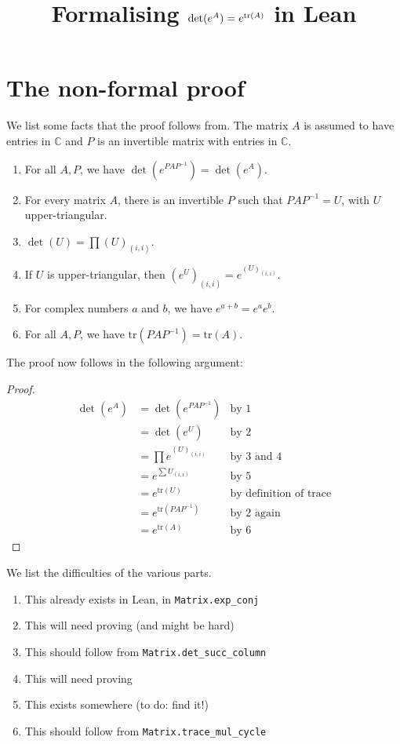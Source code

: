 \documentclass[12pt,reqno, a4paper]{amsart}
\title{Formalising $\det(e^A) = e^{\tr(A)}$ in Lean}
\author{}
\date{}
\numberwithin{equation}{section}
\theoremstyle{definition}
\newcommand{\tr}{\mathrm{tr}}
\newcommand{\C}{\mathbb{C}}
\begin{document}
\maketitle

\section{The non-formal proof}

We list some facts that the proof follows from. The matrix $A$ is assumed to have entries in $\C$ and $P$ is an invertible matrix with entries in $\C$. 

\begin{enumerate}
	\item For all $A,P$, we have $\det(e^{PAP^{-1}}) = \det(e^A)$.
	\item For every matrix $A$, there is an invertible $P$ such that $PAP^{-1} = U$, with $U$ upper-triangular.
	\item $\det(U) = \prod (U)_{(i,i)}$.
	\item If $U$ is upper-triangular, then $(e^U)_{(i,i)} = e^{(U)_{(i,i)}}$. 
	\item For complex numbers $a$ and $b$, we have $e^{a+b} = e^a e^b$.
	\item For all $A,P$, we have $\tr(PAP^{-1}) = \tr(A)$. 
\end{enumerate}

The proof now follows in the following argument: 
\begin{proof}
	\begin{align*}
		\det(e^A) & = \det(e^{PAP^{-1}}) & \text{by 1} \\ 
		& = \det(e^U) & \text{by 2} \\
		& = \prod e^{(U)_{(i,i)}} & \text{by 3 and 4} \\
		& = e^{\sum U_{(i,i)}} & \text{by 5} \\
		& = e^{\tr(U)} & \text{by definition of trace} \\ 
		& = e^{\tr(PAP^{-1})} & \text{by 2 again} \\ 
		& = e^{\tr(A)} & \text{by 6}
	\end{align*}
\end{proof}

We list the difficulties of the various parts. 

\begin{enumerate}
	\item This already exists in Lean, in \texttt{Matrix.exp\_conj}
	\item This will need proving (and might be hard)
	\item This should follow from \texttt{Matrix.det\_succ\_column}
	\item This will need proving 
	\item This exists somewhere (to do: find it!)
	\item This should follow from \texttt{Matrix.trace\_mul\_cycle}
\end{enumerate}
\end{document}
